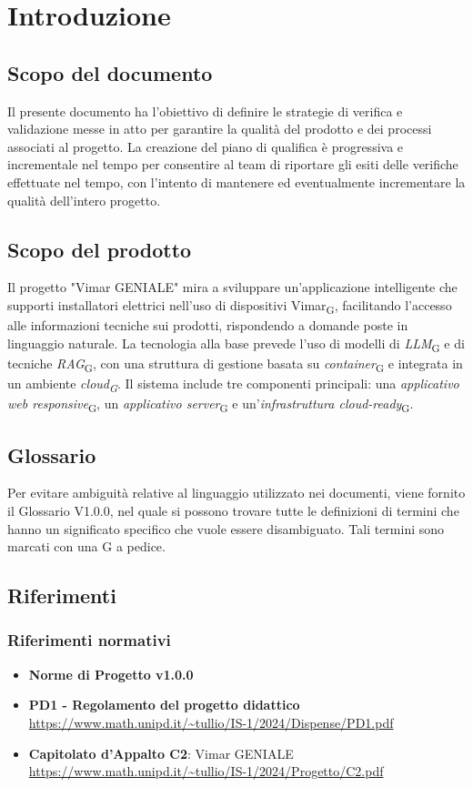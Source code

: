 \section{Introduzione}
\subsection{Scopo del documento}
Il presente documento ha l'obiettivo di definire le strategie di verifica e validazione messe in atto per garantire la qualità del prodotto e dei processi associati al progetto. La creazione del piano di qualifica è progressiva e incrementale nel tempo
per consentire al team di riportare gli esiti delle verifiche effettuate nel tempo, con l'intento di mantenere ed eventualmente incrementare la qualità dell'intero progetto.
\subsection{Scopo del prodotto}
Il progetto "Vimar GENIALE" mira a sviluppare un'applicazione intelligente che supporti installatori elettrici nell'uso di dispositivi Vimar\textsubscript{G}, facilitando l'accesso alle informazioni tecniche sui prodotti, rispondendo a domande poste in linguaggio naturale.
La tecnologia alla base prevede l'uso di modelli di \textit{LLM}\textsubscript{G} e di tecniche \textit{RAG}\textsubscript{G}, con una struttura di gestione basata su \textit{container}\textsubscript{G} e integrata in un ambiente \textit{cloud\textsubscript{G}}.
Il sistema include tre componenti principali: una \textit{applicativo web responsive}\textsubscript{G}, un \textit{applicativo server}\textsubscript{G} e un'\textit{infrastruttura cloud-ready}\textsubscript{G}. 
\subsection{Glossario}
Per evitare ambiguità relative al linguaggio utilizzato nei documenti, viene fornito il Glossario V1.0.0, nel quale si possono trovare tutte le definizioni di termini che hanno un significato specifico che vuole essere disambiguato. Tali termini sono marcati con una G a pedice.
\subsection{Riferimenti}
\subsubsection{Riferimenti normativi}
\begin{itemize}
    \item \textbf{Norme di Progetto v1.0.0}
    \item \textbf{PD1 - Regolamento del progetto didattico} \\
    \url{https://www.math.unipd.it/~tullio/IS-1/2024/Dispense/PD1.pdf} 
    \item \textbf{Capitolato d'Appalto C2}: Vimar GENIALE \\
    \url{https://www.math.unipd.it/~tullio/IS-1/2024/Progetto/C2.pdf}
    \end{itemize}
